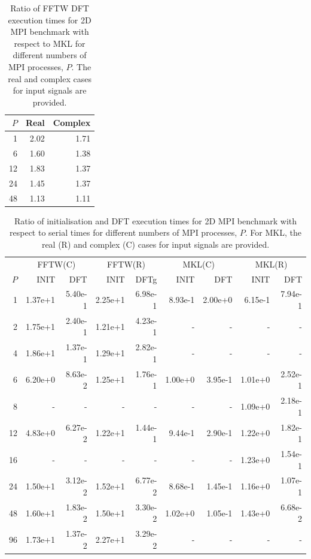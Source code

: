 \documentclass[12pt, a4paper]{article} \setlength{\textheight}{24cm}
\begin{document}
\begin{small}
\begin{table}[H]
  \centering
  \begin{tabular}{|r|r|r||}
    \hline
   $P$ & Real & Complex  \\
    \hline
    1 & 2.02 & 1.71   \\
    6 & 1.60 & 1.38  \\
   12 & 1.83 & 1.37  \\
   24 & 1.45 & 1.37  \\
   48 & 1.13 & 1.11  \\
    \hline
  \end{tabular}
  \caption{Ratio of FFTW DFT execution times for 2D MPI benchmark with respect to MKL for different numbers of MPI processes, $P.$ The real and complex cases for input signals are provided.}\label{Tbl:MPI2D}
\end{table}
\end{small}

\begin{small}
\begin{table}[H]
  \centering
  \begin{tabular}{|r|rr|rr|rr|rr|}
    \hline
    & \multicolumn{2}{|c|}{FFTW(C)} & \multicolumn{2}{|c|}{FFTW(R)} & \multicolumn{2}{|c|}{MKL(C)} &   \multicolumn{2}{|c|}{MKL(R)}   \\
   $P$ & INIT & DFT & INIT & DFTg & INIT & DFT & INIT & DFT  \\
    \hline
   1 &   1.37e+1 &   5.40e-1 &   2.25e+1 &   6.98e-1 &   8.93e-1 &   2.00e+0 &   6.15e-1 &   7.94e-1 \\
   2 &   1.75e+1 &   2.40e-1 &   1.21e+1 &   4.23e-1 &  - &  - &   - &  - \\
   4 &   1.86e+1 &   1.37e-1 &   1.29e+1 &   2.82e-1 &  - &  - &    - &  - \\
   6 &   6.20e+0 &   8.63e-2 &   1.25e+1 &   1.76e-1 &   1.00e+0 &   3.95e-1 &   1.01e+0 &   2.52e-1 \\
   8 &  - &  - &   - &  - &   - &  - &   1.09e+0 &   2.18e-1 \\
   12 &   4.83e+0 &   6.27e-2 &   1.22e+1 &   1.44e-1 &   9.44e-1 &   2.90e-1 &   1.22e+0 &   1.82e-1 \\
   16 &  - &  - &  - &  - &  - &  - &    1.23e+0 &   1.54e-1 \\
   24 &   1.50e+1 &   3.12e-2 &   1.52e+1 &   6.77e-2 &   8.68e-1 &   1.45e-1 &   1.16e+0 &   1.07e-1 \\
   48 &   1.60e+1 &   1.83e-2 &   1.50e+1 &   3.30e-2 &   1.02e+0 &   1.05e-1 &   1.43e+0 &   6.68e-2 \\
   96 &   1.73e+1 &   1.37e-2 &   2.27e+1 &   3.29e-2 &  - &  - &  - &  - \\
    \hline
  \end{tabular}
  \caption{Ratio of initialisation and DFT execution times for 2D MPI benchmark with respect to serial times for different numbers of MPI processes, $P.$ For MKL, the real (R) and complex (C) cases for input signals are provided.}\label{Tbl:MPI2DScale}
\end{table}
\end{small}
\end{document}
